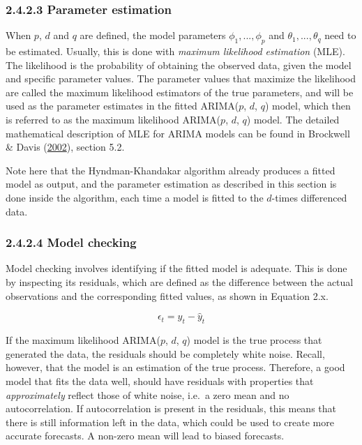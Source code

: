 \documentclass[12pt,oneside]{reedthesis}
\begin{document}
\subsubsection{2.4.2.3 Parameter estimation}\label{parameter-estimation}

When \(p\), \(d\) and \(q\) are defined, the model parameters
\(\phi_{1},...,\phi_{p}\) and \(\theta_{1},...,\theta_{q}\) need to be
estimated. Usually, this is done with \emph{maximum likelihood
estimation} (MLE). The likelihood is the probability of obtaining the
observed data, given the model and specific parameter values. The
parameter values that maximize the likelihood are called the maximum
likelihood estimators of the true parameters, and will be used as the
parameter estimates in the fitted ARIMA(\(p\), \(d\), \(q\)) model,
which then is referred to as the maximum likelihood ARIMA(\(p\), \(d\),
\(q\)) model. The detailed mathematical description of MLE for ARIMA
models can be found in Brockwell \& Davis
(\protect\hyperlink{ref-brockwell2002}{2002}), section 5.2.

Note here that the Hyndman-Khandakar algorithm already produces a fitted
model as output, and the parameter estimation as described in this
section is done inside the algorithm, each time a model is fitted to the
\(d\)-times differenced data.

\subsubsection{2.4.2.4 Model checking}\label{model-checking}

Model checking involves identifying if the fitted model is adequate.
This is done by inspecting its residuals, which are defined as the
difference between the actual observations and the corresponding fitted
values, as shown in Equation 2.x.

\[ \epsilon_{t} = y_{t} - \hat{y}_{t} \]

If the maximum likelihood ARIMA(\(p\), \(d\), \(q\)) model is the true
process that generated the data, the residuals should be completely
white noise. Recall, however, that the model is an estimation of the
true process. Therefore, a good model that fits the data well, should
have residuals with properties that \emph{approximately} reflect those
of white noise, i.e.~a zero mean and no autocorrelation. If
autocorrelation is present in the residuals, this means that there is
still information left in the data, which could be used to create more
accurate forecasts. A non-zero mean will lead to biased forecasts.
\end{document}
